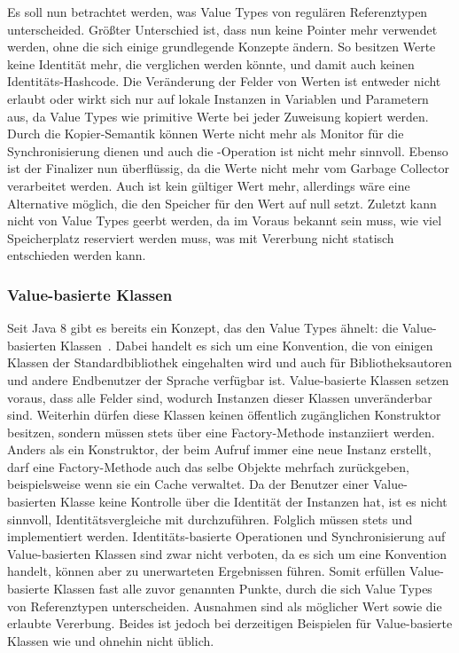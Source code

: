 Es soll nun betrachtet werden, was Value Types von regulären Referenztypen unterscheided.
Größter Unterschied ist, dass nun keine Pointer mehr verwendet werden, ohne die sich einige grundlegende Konzepte ändern.
So besitzen Werte keine Identität mehr, die verglichen werden könnte, und damit auch keinen Identitäts-Hashcode.
Die Veränderung der Felder von Werten ist entweder nicht erlaubt oder wirkt sich nur auf lokale Instanzen in Variablen und Parametern aus, da Value Types wie primitive Werte bei jeder Zuweisung kopiert werden.
Durch die Kopier-Semantik können Werte nicht mehr als Monitor für die Synchronisierung dienen und auch die -Operation ist nicht mehr sinnvoll.
Ebenso ist der Finalizer nun überflüssig, da die Werte nicht mehr vom Garbage Collector verarbeitet werden.
Auch  ist kein gültiger Wert mehr, allerdings wäre eine Alternative möglich, die den Speicher für den Wert auf null setzt.
Zuletzt kann nicht von Value Types geerbt werden, da im Voraus bekannt sein muss, wie viel Speicherplatz reserviert werden muss, was mit Vererbung nicht statisch entschieden werden kann.

\subsubsection{Value-basierte Klassen}

Seit Java 8 gibt es bereits ein Konzept, das den Value Types ähnelt: die Value-basierten Klassen~\cite{value-based-classes}.
Dabei handelt es sich um eine Konvention, die von einigen Klassen der Standardbibliothek eingehalten wird und auch für Bibliotheksautoren und andere Endbenutzer der Sprache verfügbar ist.
Value-basierte Klassen setzen voraus, dass alle Felder  sind, wodurch Instanzen dieser Klassen unveränderbar sind.
Weiterhin dürfen diese Klassen keinen öffentlich zugänglichen Konstruktor besitzen, sondern müssen stets über eine Factory-Methode instanziiert werden.
Anders als ein Konstruktor, der beim Aufruf immer eine neue Instanz erstellt, darf eine Factory-Methode auch das selbe Objekte mehrfach zurückgeben, beispielsweise wenn sie ein Cache verwaltet.
Da der Benutzer einer Value-basierten Klasse keine Kontrolle über die Identität der Instanzen hat, ist es nicht sinnvoll, Identitätsvergleiche mit \code{==} durchzuführen.
Folglich müssen stets  und  implementiert werden.
Identitäts-basierte Operationen und Synchronisierung auf Value-basierten Klassen sind zwar nicht verboten, da es sich um eine Konvention handelt, können aber zu unerwarteten Ergebnissen führen.
Somit erfüllen Value-basierte Klassen fast alle zuvor genannten Punkte, durch die sich Value Types von Referenztypen unterscheiden.
Ausnahmen sind  als möglicher Wert sowie die erlaubte Vererbung.
Beides ist jedoch bei derzeitigen Beispielen für Value-basierte Klassen wie  und  ohnehin nicht üblich.

